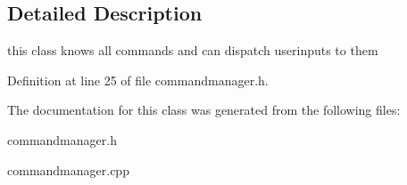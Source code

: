 \subsection{Detailed Description}
this class knows all commands and can dispatch userinputs to them 

Definition at line 25 of file commandmanager.\-h.



The documentation for this class was generated from the following files\-:\begin{DoxyCompactItemize}
\item 
commandmanager.\-h\item 
commandmanager.\-cpp\end{DoxyCompactItemize}

